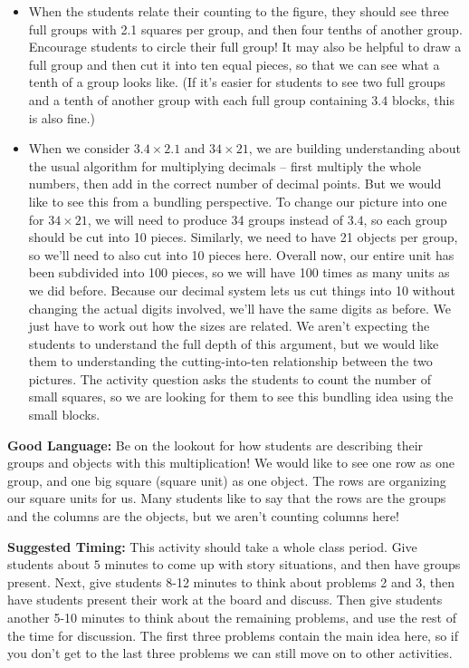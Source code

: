 \documentclass[nooutcomes,noauthor,handout]{ximera}
\begin{document}
\begin{instructorNotes}
\begin{itemize}
	\item When the students relate their counting to the figure, they should see three full groups with 2.1 squares per group, and then four tenths of another group. Encourage students to circle their full group! It may also be helpful to draw a full group and then cut it into ten equal pieces, so that we can see what a tenth of a group looks like. (If it's easier for students to see two full groups and a tenth of another group with each full group containing $3.4$ blocks, this is also fine.)
	\item When we consider $3.4 \times 2.1$ and $34 \times 21$, we are building understanding about the usual algorithm for multiplying decimals -- first multiply the whole numbers, then add in the correct number of decimal points. But we would like to see this from a bundling perspective. To change our picture into one for $34 \times 21$, we will need to produce 34 groups instead of $3.4$, so each group should be cut into 10 pieces. Similarly, we need to have 21 objects per group, so we'll need to also cut into 10 pieces here. Overall now, our entire unit has been subdivided into 100 pieces, so we will have 100 times as many units as we did before. Because our decimal system lets us cut things into 10 without changing the actual digits involved, we'll have the same digits as before. We just have to work out how the sizes are related. We aren't expecting the students to understand the full depth of this argument, but we would like them to understanding the cutting-into-ten relationship between the two pictures. The activity question asks the students to count the number of small squares, so we are looking for them to see this bundling idea using the small blocks.
\end{itemize}

{\bf Good Language:} Be on the lookout for how students are describing their groups and objects with this multiplication! We would like to see one row as one group, and one big square (square unit) as one object. The rows are organizing our square units for us. Many students like to say that the rows are the groups and the columns are the objects, but we aren't counting columns here!

{\bf Suggested Timing:} This activity should take a whole class period. Give students about $5$ minutes to come up with story situations, and then have groups present. Next, give students 8-12 minutes to think about problems 2 and 3, then have students present their work at the board and discuss. Then give students another 5-10 minutes to think about the remaining problems, and use the rest of the time for discussion. The first three problems contain the main idea here, so if you don't get to the last three problems we can still move on to other activities.


\end{instructorNotes}
\end{document}
